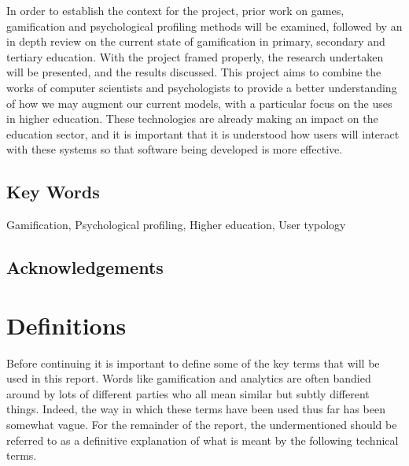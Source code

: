 \documentclass[12pt,a4paper,twoside]{report}
\begin{document}
In order to establish the context for the project, prior work on games, gamification and psychological profiling methods will be examined, followed by an in depth review on the current state of gamification in primary, secondary and tertiary education. With the project framed properly, the research undertaken will be presented, and the results discussed. This project aims to combine the works of computer scientists and psychologists to provide a better understanding of how we may augment our current models, with a particular focus on the uses in higher education. These technologies are already making an impact on the education sector, and it is important that it is understood how users will interact with these systems so that software being developed is more effective.

\section{Key Words}
Gamification, Psychological profiling, Higher education, User typology

\section{Acknowledgements}

\chapter{Definitions}
Before continuing it is important to define some of the key terms that will be used in this report. Words like gamification and analytics are often bandied around by lots of different parties who all mean similar but subtly different things. Indeed, the way in which these terms have been used thus far has been somewhat vague. For the remainder of the report, the undermentioned should be referred to as a definitive explanation of what is meant by the following technical terms.
\end{document}
